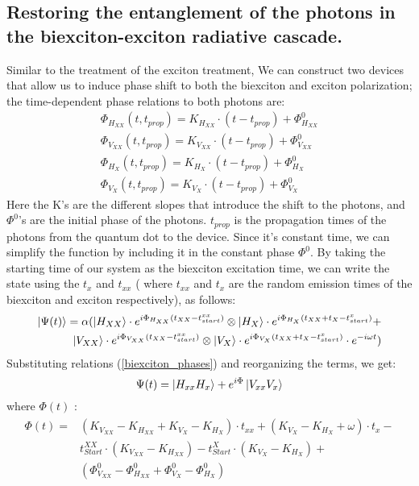 \subsection*{Restoring the entanglement of the photons in the biexciton-exciton radiative cascade.}
Similar to the treatment of the exciton treatment, We can construct two devices that allow us to induce phase shift to both the biexciton and exciton polarization; the time-dependent phase relations to both photons are: 
\begin{equation} \label{biexciton_phases}
	\begin{aligned} 
		&\Phi_{H_{XX}}{(t,t_{prop})} = K_{H_{XX}}\cdot(t-t_{prop}) + \Phi^0_{H_{XX}} & \\	&\Phi_{V_{XX}}{(t,t_{prop})} = K_{V_{XX}}\cdot(t-t_{prop}) + \Phi^0_{V_{XX}} \\
		&\Phi_{H_{X}}{(t,t_{prop})} = K_{H_{X}}\cdot(t-t_{prop}) + \Phi^0_{H_{X}} &\\
		&\Phi_{V_{X}}{(t,t_{prop})} = K_{V_{X}}\cdot(t-t_{prop}) + \Phi^0_{V_{X}} 
	\end{aligned}
\end{equation}
Here the K's are the different slopes that introduce the shift to the photons, and $\Phi^0$'s are the initial phase of the photons. $t_{prop}$ is the propagation times of the photons from the quantum dot to the device. Since it's constant time, we can simplify the function by including it in the constant phase $\Phi^0$.
By taking the starting time of our system as the biexciton excitation time, we can write the state using the $t_x$ and $t_{xx}$ ( where $t_{xx}$ and $t_{x}$ are the random emission times of the biexciton and exciton respectively), as follows:
\begin{equation}
	\begin{split}
		\ket{\Psi(t)}= \alpha(\ket{H_{XX}}\cdot e^{i\Phi_{H_{XX}}(t_{XX}-t^{xx}_{start})} \otimes 
		\ket{H_{X}}\cdot e^{i\Phi_{H_{X}}(t_{XX}+t_{X}-t^{x}_{start})}+\\
		\ket{V_{XX}}\cdot e^{i\Phi_{V_{XX}}(t_{XX}-t^{xx}_{start})} \otimes 
		\ket{V_{X}}\cdot e^{i\Phi_{V_{X}}(t_{XX}+t_{X}-t^{x}_{start})}\cdot e^{-i\omega t})	
	\end{split}
\end{equation} 
Substituting relations (\ref{biexciton_phases}) and reorganizing the terms, we get:
\begin{equation}
	\Psi(t) = \ket{H_{xx}H_x}+e^{i\Phi}\ket{V_{xx}V_x}
\end{equation}
where $\Phi(t)$ :
\begin{equation}
	\begin{split}  
		\begin{aligned} 
			\Phi(t) = &(K_{V_{XX}}-K_{H_{XX}}+K_{V_X} - K_{H_X})\cdot t_{xx}+(K_{V_X}-K_{H_X} + \omega)\cdot t_x -\\
			&t^{XX}_{Start} \cdot(K_{V_{XX}} - K_{H_{XX}})-t^X_{Start} \cdot(K_{V_X}-K_{H_X})+\\
			&(\Phi^0_{V_{XX}}-\Phi^0_{H_{XX}}+\Phi^0_{V_{X}}-\Phi^0_{H_{X}})
		\end{aligned}
	\end{split}
\end{equation}
